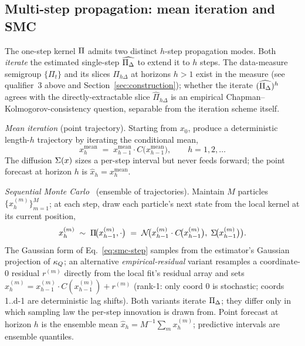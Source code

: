 \subsection{Multi-step propagation: mean iteration and SMC}
\label{sec:multistep}

The one-step kernel \(\Pi\) admits two distinct \(h\)-step
propagation modes. Both \emph{iterate} the estimated single-step
\(\widehat{\Pi_{\Delta}}\) to extend it to \(h\) steps. The data-measure
semigroup \(\{\Pi_t\}\) and its slices \(\Pi_{h\Delta}\) at horizons
\(h > 1\) exist in the measure (see qualifier~3 above and
Section~\ref{sec:construction}); whether the iterate
\((\widehat{\Pi_{\Delta}})^{h}\) agrees with the directly-extractable
slice \(\widehat{\Pi}_{h\Delta}\) is an empirical
Chapman--Kolmogorov-consistency question, separable from the
iteration scheme itself.

\emph{Mean iteration} (point trajectory). Starting from
\(x_0\), produce a deterministic length-\(h\) trajectory by iterating
the conditional mean,
\begin{equation}
\label{eq:meaniter}
x_h^{\mathrm{mean}} \;=\;
x_{h-1}^{\mathrm{mean}} \cdot C\!\bigl(x_{h-1}^{\mathrm{mean}}\bigr),
\qquad h = 1, 2, \ldots
\end{equation}
The diffusion \(\Sigma(x)\) sizes a per-step interval but never feeds
forward; the point forecast at horizon \(h\) is
\(\hat{x}_h = x_h^{\mathrm{mean}}\).

\emph{Sequential Monte Carlo}~\cite{DoucetJohansen2009}
(ensemble of trajectories). Maintain \(M\) particles
\(\{x_h^{(m)}\}_{m=1}^{M}\); at each step, draw each particle's next
state from the local kernel at its current position,
\begin{equation}
\label{eq:smc-step}
x_h^{(m)} \;\sim\; \Pi\!\bigl(x_{h-1}^{(m)}, \cdot\bigr)
\;=\; \mathcal{N}\!\bigl(x_{h-1}^{(m)} \cdot C\!\bigl(x_{h-1}^{(m)}\bigr),\;
\Sigma\!\bigl(x_{h-1}^{(m)}\bigr)\bigr).
\end{equation}
The Gaussian form of Eq.~\ref{eq:smc-step} samples from the
estimator's Gaussian projection of \(\kappa_{Q}\); an alternative
\emph{empirical-residual} variant resamples a coordinate-0 residual
\(r^{(m)}\) directly from the local fit's residual array and sets
\(x_h^{(m)} = x_{h-1}^{(m)} \cdot C(x_{h-1}^{(m)}) + r^{(m)}\)
(rank-1: only coord 0 is stochastic; coords 1..d-1 are deterministic
lag shifts). Both variants iterate \(\Pi_{\Delta}\); they differ only in
which sampling law the per-step innovation is drawn from.
Point forecast at horizon \(h\) is the ensemble mean
\(\hat{x}_h = M^{-1}\sum_m x_h^{(m)}\); predictive intervals are
ensemble quantiles.

